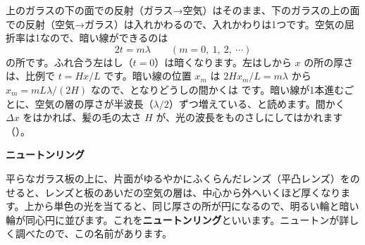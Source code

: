 上のガラスの下の面での反射（ガラス→空気）はそのまま、下のガラスの上の面での反射（空気→ガラス）は入れかわるので、入れかわりは1つです。空気の屈折率は1なので、暗い線ができるのは
\[ 2t=m\lambda\qquad(m=0,\ 1,\ 2,\ \cdots) \]
の所です。ふれ合う左はし（$t=0$）は暗くなります。左はしから $x$ の所の厚さは、比例で $t=Hx/L$ です。暗い線の位置 $x_m$ は $2Hx_m/L=m\lambda$ から $x_m=mL\lambda/(2H)$ なので、となりどうしの間かくは\label{ph:波-13:kusabi}%
です。暗い線が1本進むごとに、空気の層の厚さが半波長（$\lambda/2$）ずつ増えている、と読めます。間かく $\Delta x$ をはかれば、髪の毛の太さ $H$ が、光の波長をものさしにしてはかれます（\nobreak{}\nobreak）。

\noindent\textbf{ニュートンリング}\par\nobreak
平らなガラス板の上に、片面がゆるやかにふくらんだレンズ（平凸レンズ）をのせると、レンズと板のあいだの空気の層は、中心から外へいくほど厚くなります。上から単色の光を当てると、同じ厚さの所が円になるので、明るい輪と暗い輪が同心円に並びます。これを\textbf{ニュートンリング}といいます。ニュートンが詳しく調べたので、この名前があります。

